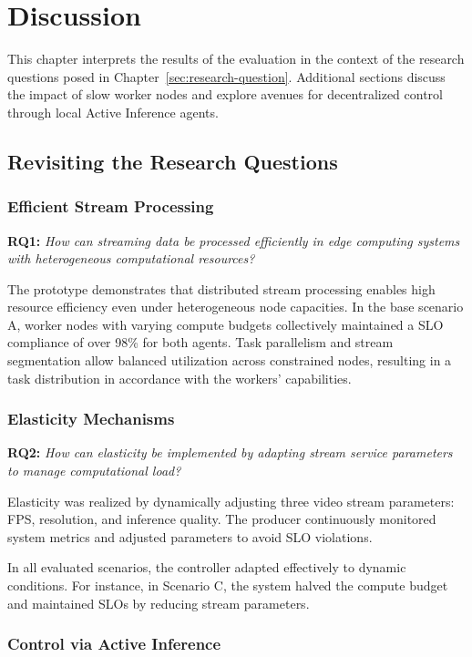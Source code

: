 \chapter{Discussion}
\label{chap:discussion}
This chapter interprets the results of the evaluation in the context of the research questions posed in Chapter~\ref{sec:research-question}. Additional sections discuss the impact of slow worker nodes and explore avenues for decentralized control through local Active Inference agents.

\section{Revisiting the Research Questions}
\subsection{Efficient Stream Processing}

\textbf{RQ1:} \textit{How can streaming data be processed efficiently in edge computing systems with heterogeneous computational resources?}

The prototype demonstrates that distributed stream processing enables high resource efficiency even under heterogeneous node capacities. In the base scenario A, worker nodes with varying compute budgets collectively maintained a SLO compliance of over 98\% for both agents. Task parallelism and stream segmentation allow balanced utilization across constrained nodes, resulting in a task distribution in accordance with the workers' capabilities.

\subsection{Elasticity Mechanisms}

\textbf{RQ2:} \textit{How can elasticity be implemented by adapting stream service parameters to manage computational load?}

Elasticity was realized by dynamically adjusting three video stream parameters: FPS, resolution, and inference quality. The producer continuously monitored system metrics and adjusted parameters to avoid SLO violations. 

In all evaluated scenarios, the controller adapted effectively to dynamic conditions. For instance, in Scenario C, the system halved the compute budget and maintained SLOs by reducing stream parameters. 

\subsection{Control via Active Inference}

